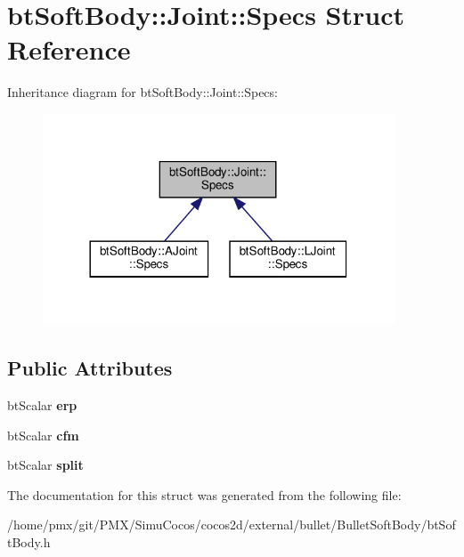 \hypertarget{structbtSoftBody_1_1Joint_1_1Specs}{}\section{bt\+Soft\+Body\+:\+:Joint\+:\+:Specs Struct Reference}
\label{structbtSoftBody_1_1Joint_1_1Specs}


Inheritance diagram for bt\+Soft\+Body\+:\+:Joint\+:\+:Specs\+:
\nopagebreak
\begin{figure}[H]
\begin{center}
\leavevmode
\includegraphics[width=296pt]{structbtSoftBody_1_1Joint_1_1Specs__inherit__graph}
\end{center}
\end{figure}
\subsection*{Public Attributes}
\begin{DoxyCompactItemize}
\item 
\mbox{\label{structbtSoftBody_1_1Joint_1_1Specs_a2128d5e934125f18c31e71baf374d812}} 
bt\+Scalar {\bfseries erp}
\item 
\mbox{\label{structbtSoftBody_1_1Joint_1_1Specs_aebc7b3a79c8dfebf22705d65cbfcd179}} 
bt\+Scalar {\bfseries cfm}
\item 
\mbox{\label{structbtSoftBody_1_1Joint_1_1Specs_a360c67be0277f561281a6f2d69eaed23}} 
bt\+Scalar {\bfseries split}
\end{DoxyCompactItemize}


The documentation for this struct was generated from the following file\+:\begin{DoxyCompactItemize}
\item 
/home/pmx/git/\+P\+M\+X/\+Simu\+Cocos/cocos2d/external/bullet/\+Bullet\+Soft\+Body/bt\+Soft\+Body.\+h\end{DoxyCompactItemize}
